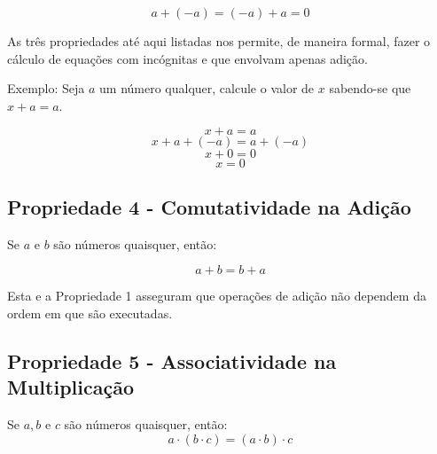\documentclass[
    12pt, %
    openright,
    twoside, %
    a4paper, %
    article,
    english,brazil %
]{abntex2}
\begin{document}
$$a+(-a)=(-a)+a=0$$

As três propriedades até aqui listadas nos permite, de maneira formal, fazer o cálculo de equações com incógnitas e que envolvam apenas adição. 

Exemplo: Seja $a$ um número qualquer, calcule o valor de $x$ sabendo-se que $x+a=a$. 

$$x+a=a$$
$$x+a+(-a)=a+(-a)$$
$$x+0=0$$
$$x=0$$

\subsection{Propriedade 4 - Comutatividade na Adição}
Se $a$ e $b$ são números quaisquer, então: 

$$a+b=b+a$$

Esta e a Propriedade 1 asseguram que operações de adição não dependem da ordem em que são executadas.

\subsection{Propriedade 5 - Associatividade na Multiplicação}
Se $a,b$ e $c$ são números quaisquer, então: 
$$ a \cdot (b \cdot c)=(a \cdot b)\cdot c $$
\end{document}
